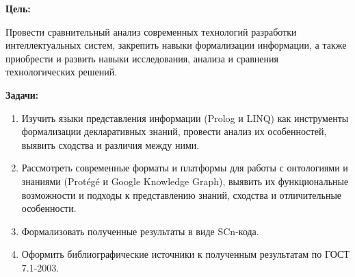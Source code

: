 
\textbf{Цель:}

Провести сравнительный анализ современных технологий разработки интеллектуальных систем, закрепить навыки формализации информации, а также приобрести и развить навыки исследования, анализа и сравнения технологических решений.

\bigskip

\textbf{Задачи:}

\begin{enumerate}
    \item Изучить языки представления информации (Prolog и LINQ) как инструменты формализации декларативных знаний, провести анализ их особенностей, выявить сходства и различия между ними.
    \item Рассмотреть современные форматы и платформы для работы с онтологиями и знаниями (Protégé и Google Knowledge Graph), выявить их функциональные возможности и подходы к представлению знаний, сходства и отличительные особенности.
    \item Формализовать полученные результаты в виде SCn-кода.
    \item Оформить библиографические источники к полученным результатам по ГОСТ 7.1-2003.
\end{enumerate}

